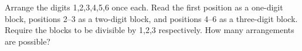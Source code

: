 Arrange the digits 1,2,3,4,5,6 once each. Read the first position as a one-digit block, positions 2--3 as a two-digit block, and positions 4--6 as a three-digit block. Require the blocks to be divisible by 1,2,3 respectively. How many arrangements are possible?
